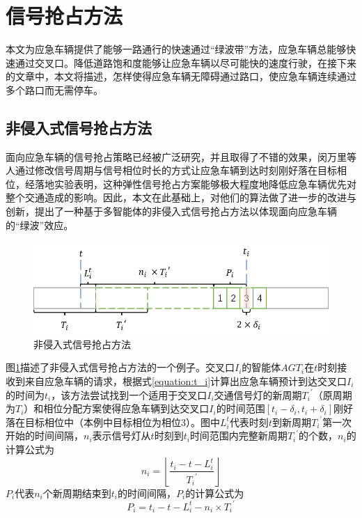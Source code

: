 

\section{信号抢占方法}
本文为应急车辆提供了能够一路通行的快速通过“绿波带”方法，应急车辆总能够快速通过交叉口。降低道路饱和度能够让应急车辆以尽可能快的速度行驶，在接下来的文章中，本文将描述，怎样使得应急车辆无障碍通过路口，使应急车辆连续通过多个路口而无需停车。


\subsection{非侵入式信号抢占方法}
面向应急车辆的信号抢占策略已经被广泛研究，并且取得了不错的效果，闵万里等人\cite{min}通过修改信号周期与信号相位时长的方式让应急车辆到达时刻刚好落在目标相位，经落地实验表明，这种弹性信号抢占方案能够极大程度地降低应急车辆优先对整个交通造成的影响。因此，本文在此基础上，对他们的算法做了进一步的改进与创新，提出了一种基于多智能体的非侵入式信号抢占方法以体现面向应急车辆的“绿波”效应。

\begin{figure}[ht]
	\centering
	\includegraphics[width=\textwidth]{figures/non-invasive.png}
	\caption{非侵入式信号抢占方法}
	\label{fig:non-invasive}
\end{figure}

图\ref{fig:non-invasive}描述了非侵入式信号抢占方法的一个例子。交叉口${I_i}$的智能体${AGT_i}$在${t}$时刻接收到来自应急车辆的请求，根据式\ref{equation:t_i}计算出应急车辆预计到达交叉口${I_i}$的时间为${t_i}$，该方法尝试找到一个适用于交叉口${I_i}$交通信号灯的新周期${{T_i}^\prime}$（原周期为${T_i}$）和相位分配方案使得应急车辆到达交叉口${I_i}$的时间范围${[t_i-\delta_i, t_i+\delta_i]}$刚好落在目标相位中（本例中目标相位为相位3）。图中${L_i^t}$代表时刻${t}$到新周期${{T_i}^\prime}$第一次开始的时间间隔，${n_i}$表示信号灯从${t}$时刻到${t_i}$时间范围内完整新周期${{T_i}^\prime}$的个数，${n_i}$的计算公式为
\begin{equation}
	\label{equation:ni}
	n_i=\left\lfloor\frac{t_i-t-L_i^t}{{T_i}^\prime}\right\rfloor
\end{equation}
${P_i}$代表${n_i}$个新周期结束到${t_i}$的时间间隔，${P_i}$的计算公式为
\begin{equation}
	\label{equation:pi}
	P_i=t_i-t-L_i^t-n_i\times{{T_i}^\prime}
\end{equation}


